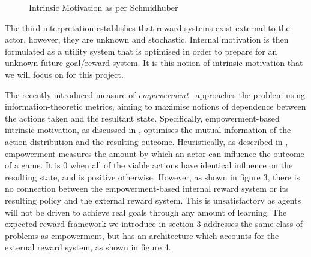 \documentclass{article}
\begin{document}
\begin{figure}[h]
\centering
{}
\caption{Intrinsic Motivation as per Schmidhuber} \label{fig:M2}
\end{figure}

The third interpretation \cite{mohamed2015variational,salge2014empowerment} establishes that reward systems exist external to the actor, however, they are unknown and stochastic. Internal motivation is then formulated as a utility system that is optimised in order to prepare for an unknown future goal/reward system. It is this notion of intrinsic motivation that we will focus on for this project. 

The recently-introduced measure of \emph{empowerment}~\citep{mohamed2015variational, salge2014empowerment} approaches the problem using information-theoretic metrics, aiming to maximise notions of dependence between the actions taken and the resultant state. Specifically, empowerment-based intrinsic motivation, as discussed in \citep{mohamed2015variational}, optimises the mutual information of the action distribution and the resulting outcome.
Heuristically, as described in \cite{salge2014empowerment}, empowerment measures the amount by which an actor can influence the outcome of a game.
It is $0$ when all of the viable actions have identical influence on the resulting state, and is positive otherwise. However, as shown in figure 3, there is no connection between the empowerment-based internal reward system or its resulting policy and the external reward system. This is unsatisfactory as agents will not be driven to achieve real goals through any amount of learning. The expected reward framework we introduce in section 3 addresses the same class of problems as empowerment, but has an architecture which accounts for the external reward system, as shown in figure 4. 
\end{document}
